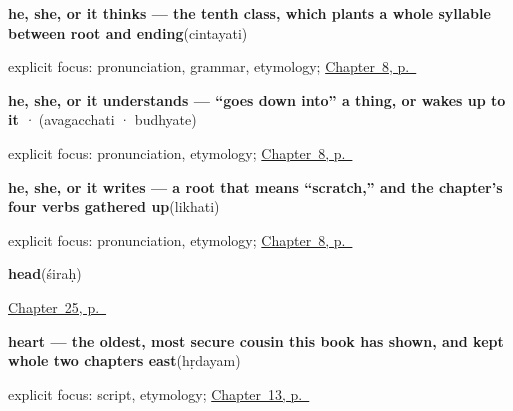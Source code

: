 \noindent\begin{minipage}[t]{\linewidth}
\raggedright
\textbf{he, she, or it thinks — the tenth class, which plants a whole syllable  between root and ending}\enspace\emph{}\enspace(cintayati)\par
\footnotesize explicit focus: pronunciation, grammar, etymology; \hyperref[ch:sa-mind-verbs]{Chapter~8, p.~\pageref*{ch:sa-mind-verbs}}
\end{minipage}\par\smallskip

\noindent\begin{minipage}[t]{\linewidth}
\raggedright
\textbf{he, she, or it understands — \textquotedblleft{}goes down into\textquotedblright{} a thing, or wakes up to it}\enspace\emph{ · }\enspace(avagacchati · budhyate)\par
\footnotesize explicit focus: pronunciation, etymology; \hyperref[ch:sa-mind-verbs]{Chapter~8, p.~\pageref*{ch:sa-mind-verbs}}
\end{minipage}\par\smallskip

\noindent\begin{minipage}[t]{\linewidth}
\raggedright
\textbf{he, she, or it writes — a root that means \textquotedblleft{}scratch,\textquotedblright{} and the chapter's four verbs gathered up}\enspace\emph{}\enspace(likhati)\par
\footnotesize explicit focus: pronunciation, etymology; \hyperref[ch:sa-mind-verbs]{Chapter~8, p.~\pageref*{ch:sa-mind-verbs}}
\end{minipage}\par\smallskip

\noindent\begin{minipage}[t]{\linewidth}
\raggedright
\textbf{head}\enspace\emph{}\enspace(śiraḥ)\par
\footnotesize \hyperref[ch:sa-body-more]{Chapter~25, p.~\pageref*{ch:sa-body-more}}
\end{minipage}\par\smallskip

\noindent\begin{minipage}[t]{\linewidth}
\raggedright
\textbf{heart — the oldest, most secure cousin this book has shown, and kept whole two chapters east}\enspace\emph{}\enspace(hṛdayam)\par
\footnotesize explicit focus: script, etymology; \hyperref[ch:sa-face-nouns-2]{Chapter~13, p.~\pageref*{ch:sa-face-nouns-2}}
\end{minipage}\par\smallskip

